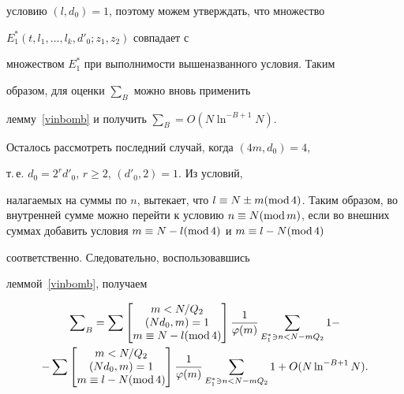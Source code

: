 условию $(l, d_0)=1$, поэтому можем утверждать, что множество


$E^\ast_1(t, l_1, \dotsc, l_k, d'_0; z_1, z_2)$ совпадает с


множеством $E^*_1$ при выполнимости вышеназванного условия. Таким


образом, для оценки $\sum_B$ можно вновь применить


лемму~\ref{vinbomb} и получить $\sum_B = O ( N \ln^{-B+1} N)$.





Осталось рассмотреть последний случай, когда $(4m,d_0)=4$,


т.\,е. $d_0 = 2^r d'_0$, $r \ge 2$, $(d'_0, 2)=1$. Из условий,


налагаемых на суммы по $n$, вытекает, что $l \equiv N \pm m (\Mod


4)$. Таким образом, во внутренней сумме можно перейти к условию $n


\equiv N (\Mod m)$, если во внешних суммах добавить условия $m


\equiv N - l (\Mod 4)$ и $m \equiv l - N (\Mod 4)$


соответственно. Следовательно, воспользовавшись


леммой~\ref{vinbomb}, получаем


\begin{multline*}


\sum\nolimits_B


= \sum 


\begin{bmatrix}


m < N/Q_2\\ (N d_0, m)=1\\ m \equiv N - l (\Mod 4)


\end{bmatrix} \frac1{\varphi(m)}


\sum_{E^*_1 \ni n < N- m Q_2} 1 -\\


- \sum


\begin{bmatrix}


m < N/Q_2\\ (N d_0, m)=1\\ m \equiv l - N (\Mod 4)


\end{bmatrix} \frac1{\varphi(m)}


\sum_{E^*_1 \ni n < N- m Q_2} 1


+ O ( N \ln^{-B+1} N ).


\end{multline*}


